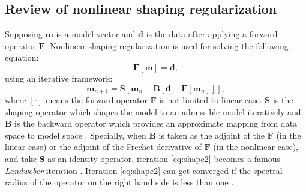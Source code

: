 \subsection{Review of nonlinear shaping regularization}
Supposing $\mathbf{m}$ is a model vector and $\mathbf{d}$ is the data after applying a forward operator $\mathbf{F}$. Nonlinear shaping regularization is used for solving the following equation:
\begin{equation}
\label{eq:shape1}
\mathbf{F}[\mathbf{m}]=\mathbf{d},
\end{equation}
using an iterative framework:
\begin{equation}
\label{eq:shape2}
\mathbf{m}_{n+1} = \mathbf{S}[\mathbf{m}_n+\mathbf{B}[\mathbf{d}-\mathbf{F}[\mathbf{m}_n]]],
\end{equation}
where $[\cdot]$ means the forward operator $\mathbf{F}$ is not limited to linear case. $\mathbf{S}$ is the shaping operator which shapes the model to an admissible model iteratively and $\mathbf{B}$ is the backward operator which provides an approximate mapping from data space to model space \cite[]{fomel3}. Specially, when $\mathbf{B}$ is taken as the adjoint of the $\mathbf{F}$ (in the linear case) or the adjoint of the Frechet derivative of $\mathbf{F}$ (in the nonlinear case), and take $\mathbf{S}$ as an identity operator, iteration \ref{eq:shape2} becomes a famous \emph{Landweber} iteration \cite[]{landweber}. Iteration \ref{eq:shape2} can get converged if the spectral radius of the operator on the right hand side is less than one \cite[]{collatz1966}.

